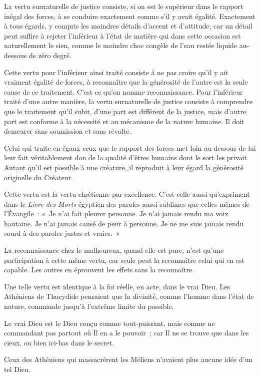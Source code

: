\documentclass[french,twoside]{book} %
\begin{document}
La vertu surnaturelle de justice consiste, si on est le supérieur dans le rapport inégal des forces, à se conduire exactement comme s'il y avait égalité. Exactement à tous égards, y compris les moindres détails d'accent et d'attitude, car un détail peut suffire à rejeter l'inférieur à l'état de matière qui dans cette occasion est naturellement le sien, comme le moindre choc congèle de l'eau restée liquide au-dessous de zéro degré.\par
Cette vertu pour l'inférieur ainsi traité consiste à ne pas croire qu'il y ait vraiment égalité de forces, à reconnaître que la générosité de l'autre est la seule cause de ce traitement. C'est ce qu'on nomme reconnaissance. Pour l'inférieur traité d'une autre manière, la vertu surnaturelle de justice consiste à comprendre que le traitement qu'il subit, d'une part est différent de la justice, mais d'autre part est conforme à la nécessité et au mécanisme de la nature humaine. Il doit demeurer sans soumission et sans révolte.\par
Celui qui traite en égaux ceux que le rapport des forces met loin au-dessous de lui leur fait véritablement don de la qualité d'êtres humains dont le sort les privait. Autant qu'il est possible à une créature, il reproduit à leur égard la générosité originelle du Créateur.\par
Cette vertu est la vertu chrétienne par excellence. C'est celle aussi qu'expriment dans le {\itshape Livre des Morts} égyptien des paroles aussi sublimes que celles mêmes de l'Évangile : « Je n'ai fait pleurer personne. Je n'ai jamais rendu ma voix hautaine. Je n'ai jamais causé de peur à personne. Je ne me suis jamais rendu sourd à des paroles justes et vraies. »\par
La reconnaissance chez le malheureux, quand elle est pure, n'est qu'une participation à cette même vertu, car seule peut la reconnaître celui qui en est capable. Les autres en éprouvent les effets sans la reconnaître.\par
Une telle vertu est identique à la foi réelle, en acte, dans le vrai Dieu. Les Athéniens de Thucydide pensaient que la divinité, comme l'homme dans l'état de nature, commande jusqu'à l'extrême limite du possible.\par
Le vrai Dieu est le Dieu conçu comme tout-puissant, mais comme ne commandant pas partout où Il en a le pouvoir ; car Il ne se trouve que dans les cieux, ou bien ici-bas dans le secret.\par
Ceux des Athéniens qui massacrèrent les Méliens n'avaient plus aucune idée d'un tel Dieu.\par
\end{document}
